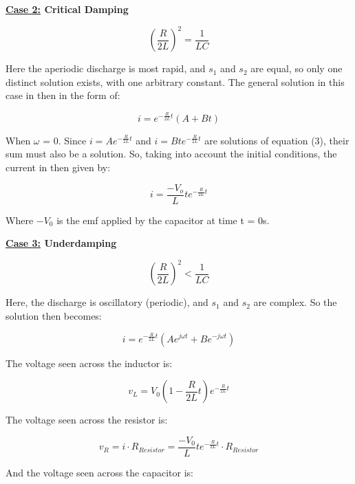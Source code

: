 \documentclass[twocolumn, letterpaper, 10pt, twoside]{article}
\begin{document}
\textbf{\underline{Case 2:} Critical Damping}

\begin{equation}
(\frac{R}{2L})^2 = \frac{1}{LC}
\end{equation}

Here the aperiodic discharge is most rapid, and $s_1$ and $s_2$ are equal, so only one distinct solution exists, with one arbitrary constant. The general solution in this case in then in the form of: 

   \begin{equation}
i = e^{-\frac{R}{2L}t}(A + Bt)
\end{equation}

When $\omega$ = 0. Since $i = Ae^{-\frac{R}{2L}t}$ and $i = Bte^{-\frac{R}{2L}t}$ are  solutions of equation (3), their sum must also be a solution. So, taking into account the initial conditions, the current in then given by: 

   \begin{equation}
i = \frac{-V_o}{L}te^{-\frac{R}{2L}t}
\end{equation}

Where $-V_0$ is the emf applied by the capacitor at time t = 0s. 

\textbf{\underline{Case 3:} Underdamping}

   \begin{equation}
(\frac{R}{2L})^2 < \frac{1}{LC}
\end{equation}

Here, the discharge is oscillatory (periodic), and $s_1$ and $s_2$ are complex. So the solution then becomes:

   \begin{equation}
i = e^{-\frac{R}{2L}t}(Ae^{j\omega t} + Be^{-j\omega t})
\end{equation}

The voltage seen across the inductor is: 

   \begin{equation}
v_L = V_0(1 - \frac{R}{2L}t)e^{-\frac{R}{2L}t}
\end{equation}

The voltage seen across the resistor is: 

   \begin{equation}
v_R = i \cdot R_{Resistor} = \frac{-V_0}{L}te^{-\frac{R}{2L}t} \cdot R_{Resistor}
\end{equation}

And the voltage seen across the capacitor is: 
\end{document}
